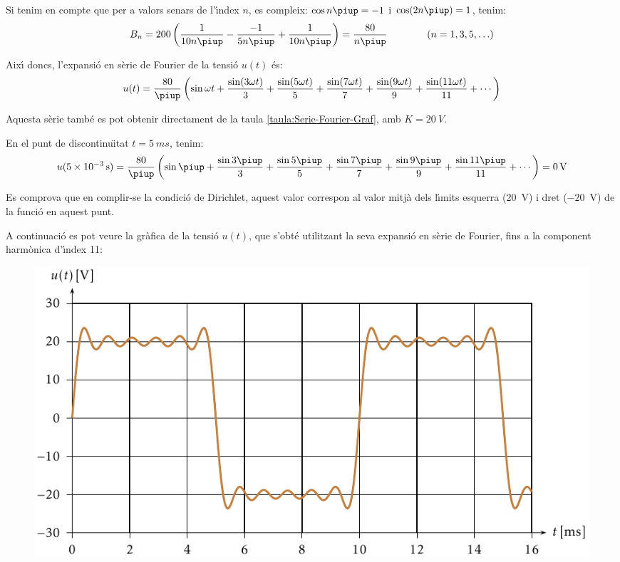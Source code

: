 \begin{exemple}
Si tenim en compte que per a valors senars de l'\'{\i}ndex $n$, es
compleix: $\cos n \piup = -1$ i $\cos (2 n \piup) = 1$, tenim:
\[
    B_n = 200 \left( \frac{1}{10 n \piup} - \frac{-1}{5 n \piup} +
    \frac{1}{10 n \piup} \right) = \frac{80}{n \piup}
    \qquad\qquad(n=1,3,5,\ldots)
\]

Aix\'{\i} doncs, l'expansi\'{o} en s\`{e}rie de Fourier de la tensi\'{o} $u(t)$ \'{e}s:
\[
    u(t) = \frac{80}{\piup} \left( \sin \omega t + \frac{\sin (3 \omega t)}{3} +
    \frac{\sin (5 \omega t)}{5} + \frac{\sin (7 \omega t)}{7} +
    \frac{\sin (9 \omega t)}{9} + \frac{\sin (11 \omega t)}{11} +\cdots\right)
\]

Aquesta s\`{e}rie tamb\'{e} es pot obtenir directament de la taula \vref{taula:Serie-Fourier-Graf}, amb $K=\SI{20}{V}$.

En el punt de discontinu\"{\i}tat $t=\SI{5}{ms}$, tenim:
\[
    u(\SI{5e-3}{s}) =\frac{80}{\piup} \left( \sin \piup + \frac{\sin 3 \piup}{3} +
    \frac{\sin 5 \piup}{5} + \frac{\sin 7 \piup}{7} +
    \frac{\sin 9 \piup}{9} +\frac{\sin 11 \piup}{11}+\cdots\right) = \SI{0}{V}
\]

Es comprova que en complir-se la condici\'{o} de Dirichlet, aquest valor
correspon al valor mitj\`{a} dels l\'{\i}mits esquerra (\SI{20}{V}) i dret (\SI{-20}{V})  de
la funci\'{o} en aquest punt.

A continuaci\'{o} es pot veure la gr\`{a}fica de la tensi\'{o} $u(t)$, que
s'obt\'{e} utilitzant la seva expansi\'{o} en s\`{e}rie de Fourier, fins a la
component harm\`{o}nica d'\'{\i}ndex 11:
\vspace{5mm}
\begin{figure}[h!b]
\centering
    \includegraphics{Imatges/Cap-Fourier-Exemple-Tensio.pdf}
\end{figure}


\end{exemple}
